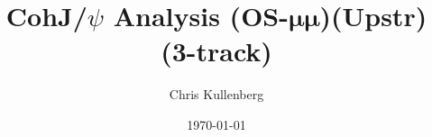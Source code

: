 \title{CohJ/$\psi$ Analysis (\textbf{OS}-$\boldsymbol{\mu\mu}$)(\textbf{Upstr})(\textbf{3-track})}
\author{Chris Kullenberg}
\date{\today}
